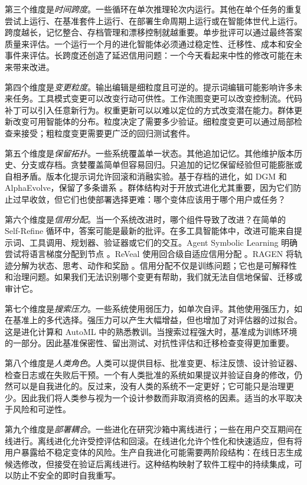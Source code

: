 第三个维度是\emph{时间跨度}。一些循环在单次推理轮次内运行。其他在单个任务的重复尝试上运行、在基准套件上运行、在部署生命周期上运行或在智能体世代上运行。跨度越长，记忆整合、存档管理和漂移控制就越重要。单步批评可以通过最终答案质量来评估。一个运行一个月的进化智能体必须通过稳定性、迁移性、成本和安全事件来评估。长跨度还创造了延迟信用问题：一个今天看起来中性的修改可能在未来带来改进。

第四个维度是\emph{变更粒度}。输出编辑是细粒度且可逆的。提示词编辑可能影响许多未来任务。工具模式变更可以改变行动可供性。工作流图变更可以改变控制流。代码补丁可以引入任意新行为。权重更新可以以难以定位的方式改变潜在能力。群体更新改变可用智能体的分布。粒度决定了需要多少验证。细粒度变更可以通过局部检查来接受；粗粒度变更需要更广泛的回归测试套件。

第五个维度是\emph{保留拓扑}。一些系统覆盖单一状态。其他追加记忆。其他维护版本历史、分支或存档。贪婪覆盖简单但容易回归。只追加的记忆保留经验但可能膨胀或自相矛盾。版本化提示词允许回滚和消融实验。基于存档的进化，如 DGM 和 AlphaEvolve，保留了多条谱系 \cite{darwingodelmachine2025,alphaevolve2025}。群体结构对于开放式进化尤其重要，因为它们防止过早收敛，但它们也使部署选择更难：哪个变体应该用于哪个用户或任务？

第六个维度是\emph{信用分配}。当一个系统改进时，哪个组件导致了改进？在简单的 Self-Refine 循环中，答案可能是最新的批评。在多工具智能体中，改进可能来自提示词、工具调用、规划器、验证器或它们的交互。Agent Symbolic Learning 明确尝试将语言梯度分配到节点 \cite{agentsymboliclearning2024}。ReVeal 使用回合级自适应信用分配 \cite{reveal2025}。RAGEN 将轨迹分解为状态、思考、动作和奖励 \cite{wang2025ragen}。信用分配不仅是训练问题；它也是可解释性和治理问题。如果我们无法识别哪个变更有帮助，我们就无法自信地保留、迁移或审计它。

第七个维度是\emph{搜索压力}。一些系统使用弱压力，如单次自评。其他使用强压力，如在基准上的多代选择。强压力可以产生大幅增益，但也增加了对评估器的过拟合。这是进化计算和 AutoML 中的熟悉教训。当搜索过程强大时，基准成为训练环境的一部分。因此基准保密性、留出测试、对抗性评估和迁移检查变得更加重要。

第八个维度是\emph{人类角色}。人类可以提供目标、批准变更、标注反馈、设计验证器、检查日志或在失败后干预。一个有人类批准的系统如果提议并验证自身的修改，仍然可以是自我进化的。反过来，没有人类的系统不一定更好；它可能只是治理更少。因此我们将人类参与视为一个设计参数而非取消资格的因素。适当的水平取决于风险和可逆性。

第九个维度是\emph{部署耦合}。一些进化在研究沙箱中离线进行；一些在用户交互期间在线进行。离线进化允许受控评估和回滚。在线进化允许个性化和快速适应，但有将用户暴露给不稳定变体的风险。生产自我进化可能需要两阶段结构：在线日志生成候选修改，但接受在验证后离线进行。这种结构映射了软件工程中的持续集成，可以防止不安全的即时自我重写。

